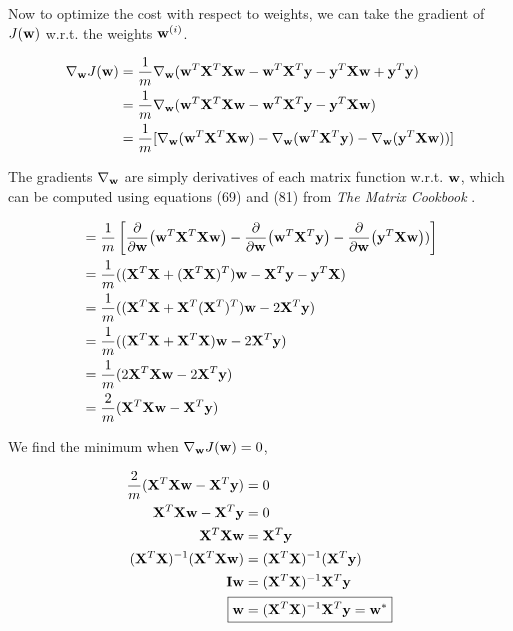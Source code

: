 \documentclass[11pt]{article}
\begin{document}
\begin{enumerate}[start=1,label={\bfseries Question \arabic*:},leftmargin=1in]
        Now to optimize the cost with respect to weights, we can take the gradient of \(J(\vb{w})\) w.r.t. the weights \(\vb{w}^{(i)}\).

        \begin{align}
            \nabla_{\vb{w}} J(\vb{w}) &= \frac{1}{m} \nabla_{\vb{w}} (  \vb{w}^T\vb{X}^T\vb{Xw} - \vb{w}^T\vb{X}^T\vb{y} - \vb{y}^T \vb{Xw} + \vb{y}^T\vb{y} ) \\
                                      &= \frac{1}{m} \nabla_{\vb{w}} (  \vb{w}^T\vb{X}^T\vb{Xw} - \vb{w}^T\vb{X}^T\vb{y} - \vb{y}^T \vb{Xw}  ) \\
                                      &= \frac{1}{m} [ \nabla_{\vb{w}} (  \vb{w}^T\vb{X}^T\vb{Xw } ) - \nabla_{\vb{w}} ( \vb{w}^T\vb{X}^T\vb{y} ) - \nabla_{\vb{w}} ( \vb{y}^T \vb{Xw}  ) ) ]
        \end{align}

        The gradients \(\nabla_{\vb{w}}\) are simply derivatives of each matrix function w.r.t. \(\vb{w}\), which can be computed using equations (69) and (81) from \emph{The Matrix Cookbook} \cite{matrixcookbook}.

        \begin{align}
            &= \frac{1}{m} \left[ \pdv{\vb{w}} (  \vb{w}^T\vb{X}^T\vb{Xw } ) - \pdv{\vb{w}} ( \vb{w}^T\vb{X}^T\vb{y} ) - \pdv{\vb{w}} ( \vb{y}^T \vb{Xw}  ) ) \right] \\
            &= \frac{1}{m} ( (\vb{X}^T\vb{X} + ( \vb{X}^T\vb{X} )^T )\vb{w} - \vb{X}^T\vb{y} - \vb{y}^T\vb{X} ) \\
            &= \frac{1}{m} ( (\vb{X}^T\vb{X} + \vb{X}^T ( \vb{X}^T )^T )\vb{w} - 2\vb{X}^T\vb{y} ) \\
            &= \frac{1}{m} ( (\vb{X}^T\vb{X} + \vb{X}^T\vb{X})\vb{w} - 2\vb{X}^T\vb{y} ) \\
            &= \frac{1}{m} (2\vb{X}^T\vb{X}\vb{w} - 2\vb{X}^T\vb{y} ) \\
            &= \frac{2}{m} (\vb{X}^T\vb{X}\vb{w} - \vb{X}^T\vb{y} )
        \end{align}

        We find the minimum when \(\nabla_{\vb{w}} J (\vb{w}) = 0\),

        \begin{align}
            \frac{2}{m} (\vb{X}^T\vb{X}\vb{w} - \vb{X}^T\vb{y} ) &= 0 \\
            \vb{X}^T\vb{X}\vb{w} - \vb{X}^T\vb{y} &= 0 \\
            \vb{X}^T\vb{X}\vb{w} &= \vb{X}^T\vb{y} \\
            (\vb{X}^T\vb{X})^{-1} ( \vb{X}^T\vb{X}\vb{w} ) &= (\vb{X}^T\vb{X})^{-1} ( \vb{X}^T\vb{y}) \\
            \vb{I}\vb{w} &= (\vb{X}^T\vb{X})^{-1} \vb{X}^T\vb{y} \\
            \Aboxed{\vb{w} &= (\vb{X}^T\vb{X})^{-1} \vb{X}^T\vb{y} = \vb{w}^*}
        \end{align}


\end{enumerate}
\end{document}
